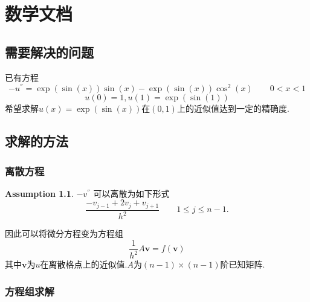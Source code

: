 \documentclass[a4paper]{book}
\makeatletter
\newcommand{\voidenvironment}[1]{%
  \expandafter\providecommand\csname env@#1@save@env\endcsname{}%
  \expandafter\providecommand\csname env@#1@process\endcsname{}%
  \@ifundefined{#1}{}{\RenewEnviron{#1}{}}%
}
\numberwithin{equation}{chapter}
\theoremstyle{definition}
\newtheorem{asm}[thm]{Assumption}
\makeatother
\begin{document}
\pagestyle{empty}




\setcounter{chapter}{0}




\chapter{数学文档}

\section{需要解决的问题}
已有方程
\[- u^{''} = \exp(\sin(x))\sin(x) - \exp(\sin(x)) \cos^2(x) \qquad 0 < x < 1\]
\[u(0) = 1, u(1) = \exp(\sin(1))\]
希望求解$u(x) = \exp(\sin(x))$在$(0,1)$上的近似值达到一定的精确度.
\section{求解的方法}
\subsection{离散方程}
\begin{asm}
	$-v^{''}$ 可以离散为如下形式
	\[\frac{-v_{j-1} + 2 v_j + v_{j+1}}{h^2} \qquad 1 \leq j \leq n-1. \]
\end{asm}
因此可以将微分方程变为方程组
\[ \frac{1}{h^2} A \mathbf{v} = f(\mathbf{v})\]
其中$\mathbf{v}$为$u$在离散格点上的近似值.$A$为$(n-1)\times(n-1)$阶已知矩阵.

\subsection{方程组求解}
\end{document}
